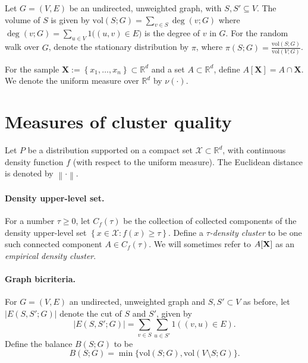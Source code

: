 \documentclass{article}
\newcommand{\set}[1]{\left\{#1\right\}}
\newcommand{\vol}{\text{vol}}
\newcommand{\abs}[1]{\left \lvert #1 \right \rvert}
\newcommand{\Reals}{\mathbb{R}}
\newcommand{\Rd}{\Reals^d}
\newcommand{\norm}[1]{\left\lVert#1\right\rVert}
\newcommand{\1}{\mathbf{1}}
\theoremstyle{aldenthm}
\theoremstyle{remark}
\begin{document}
Let $G = (V,E)$ be an undirected, unweighted graph, with $S,S' \subseteq V$.
The volume of $S$ is given by $\vol(S; G) = \sum_{v \in S} \deg(v; G) $
where $\deg(v; G) = \sum_{u \in V} 1\bigl((u,v) \in E\bigr)$ is the degree of $v$ in $G$. For the random walk over $G$, denote the stationary distribution by $\pi$, where $\pi(S; G) = \frac{\vol(S ; G)}{\vol(V; G)}$. 

\vspace{.05 in}

For the sample $\mathbf{X} := \set{x_1, \ldots, x_n} \subset \Rd$ and a set $A \subset \Rd$, define $A[\mathbf{X}] = A \cap \mathbf{X}$. We denote the uniform measure over $\Rd$ by $\nu(\cdot)$.

\section{Measures of cluster quality}
\label{sec: measures_of_cluster_quality}

Let $P$ be a distribution supported on a compact set $\mathcal{X} \subset \Rd$, with continuous density function $f$ (with respect to the uniform measure). The Euclidean distance is denoted by $\norm{ \cdot }$. 

\paragraph{Density upper-level set.}
For a number $\tau \geq 0$, let $C_f(\tau)$ be the collection of collected components of the density upper-level set $\set{x \in \mathcal{X}: f(x) \geq \tau}$. Define a \textit{$\tau$-density cluster} to be one such connected component $A \in C_f(\tau)$.  We will sometimes refer to $A[\bf{X}]$ as an \textit{empirical density cluster}.

\paragraph{Graph bicriteria.}
For $G = (V,E)$ an undirected, unweighted graph and $S, S' \subset V$ as before, let $\abs{E(S, S'; G)}$ denote the cut of $S$ and $S'$, given by
\begin{equation*}
\abs{E(S, S'; G)} = \sum_{v \in S} \sum_{u \in S'} 1((v,u) \in E).
\end{equation*}
Define the balance $B(S; G)$ to be
\begin{equation*}
B(S; G) = \min\{\vol(S;G), \vol(V \setminus S;G)\}.
\end{equation*}
\end{document}
